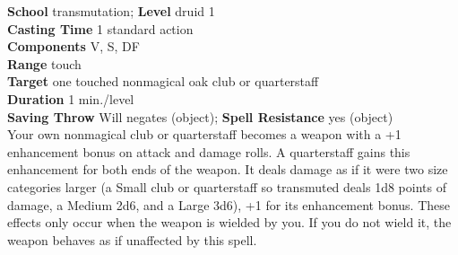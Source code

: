\textbf{School} transmutation; \textbf{Level} druid 1\\
\textbf{Casting Time} 1 standard action\\
\textbf{Components} V, S, DF\\
\textbf{Range} touch\\
\textbf{Target} one touched nonmagical oak club or quarterstaff\\
\textbf{Duration} 1 min./level\\
\textbf{Saving Throw }Will negates (object); \textbf{Spell Resistance} yes (object)\\
Your own nonmagical club or quarterstaff becomes a weapon with a +1 enhancement bonus on attack and damage rolls. A quarterstaff gains this enhancement for both ends of the weapon. It deals damage as if it were two size categories larger (a Small club or quarterstaff so transmuted deals 1d8 points of damage, a Medium 2d6, and a Large 3d6), +1 for its enhancement bonus. These effects only occur when the weapon is wielded by you. If you do not wield it, the weapon behaves as if unaffected by this spell.\\
